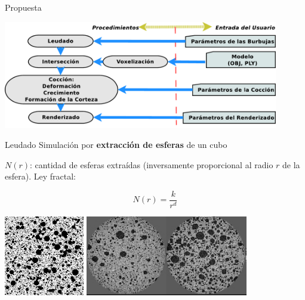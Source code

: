 \documentclass[spanish,unknownkeysallowed]{beamer}
\begin{document}
\begin{frame}{Propuesta}
\centerline{\includegraphics[width=12cm]{../figures/pipeline}}
\end{frame}

\begin{frame}{Leudado}
Simulación por \textbf{extracción de esferas} de un cubo

$N(r)$: cantidad de esferas extraídas (inversamente proporcional al radio $r$ de la esfera). Ley fractal:

\begin{equation}
N(r) = \frac{k}{r^{d}}
\end{equation}

\vspace{0.3cm}
\centering
\includegraphics[height=3.5cm]{../figures/bubbles}
\includegraphics[height=3.5cm]{../figures/proving}
\end{frame}
\end{document}
